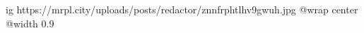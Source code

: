  
 
 
 
 

\ifcmt
  ig https://mrpl.city/uploads/posts/redactor/znnfrphtlhv9gwuh.jpg
  @wrap center
  @width 0.9
\fi
